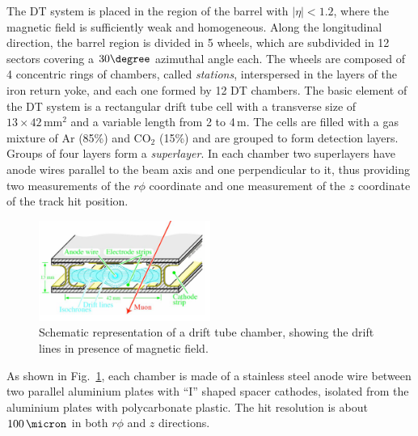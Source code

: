 The DT system is placed in the region of the barrel with $|\eta|<1.2$, where the magnetic field is sufficiently weak and homogeneous. Along the longitudinal direction, the barrel region is divided in 5 wheels, which are subdivided in 12 sectors covering a $30\degree$ azimuthal angle each. The wheels are composed of 4 concentric rings of chambers, called \emph{stations}, interspersed in the layers of the iron return yoke, and each one formed by 12 DT chambers. The basic element of the DT system is a rectangular drift tube cell with a transverse size of $13\times42\,\mathrm{mm^2}$ and a variable length from 2 to 4\,m. The cells are filled with a gas mixture of Ar (85\%) and $\mathrm{CO_2}$ (15\%) and are grouped to form detection layers. Groups of four layers form a \emph{superlayer}. In each chamber two superlayers have anode wires parallel to the beam axis and one perpendicular to it, thus providing two measurements of the $r\phi$ coordinate and one measurement of the $z$ coordinate of the track hit position.
\begin{figure}[htb]
\centering
\includegraphics[width=0.5\textwidth]{images/drifttube.png}
\caption{Schematic representation of a drift tube chamber, showing the drift lines in presence of magnetic field.}\label{fig:dt}
\end{figure}
As shown in Fig.~\ref{fig:dt}, each chamber is made of a stainless steel anode wire between two parallel aluminium plates with ``I'' shaped spacer cathodes, isolated from the aluminium plates with polycarbonate plastic. The hit resolution is about $100\,\micron$ in both $r\phi$ and $z$ directions.

